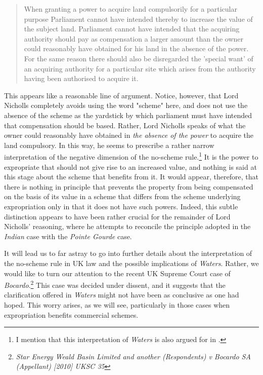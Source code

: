 \begin{quote}
When granting a power to acquire land compulsorily for a particular purpose Parliament cannot have intended thereby to increase the value of the subject land. Parliament cannot have intended that the acquiring authority should pay as compensation a larger amount than the owner could reasonably have obtained for his land in the absence of the power. For the same reason there should also be disregarded the 'special want' of an acquiring authority for a particular site which arises from the authority having been authorised to acquire it.
\end{quote}

This appears like a reasonable line of argument. Notice, however, that Lord Nicholls completely avoids using the word "scheme" here, and does not use the absence of the scheme as the yardstick by which parliament must have intended that compensation should be based. Rather, Lord Nicholls speaks of what the owner could reasonably have obtained in \emph{the absence of the power} to acquire the land compulsory. In this way, he seems to prescribe a rather narrow interpretation of the negative dimension of the no-scheme rule.\footnote{I mention that this interpretation of \emph{Waters} is also argued for in \cite{newuk}.} It is the power to expropriate that should not give rise to an increased value, and nothing is said at this stage about the scheme that benefits from it. It would appear, therefore, that there is nothing in principle that prevents the property from being compensated on the basis of its value in a scheme that differs from the scheme underlying expropriation only in that it does not have such powers. Indeed, this subtle distinction appears to have been rather crucial for the remainder of Lord Nicholls' reasoning, where he attempts to reconcile the principle adopted in the \emph{Indian} case with the \emph{Pointe Gourde} case.

It will lead us to far astray to go into further details about the interpretation of the no-scheme rule in UK law and the possible implications of \emph{Waters}. Rather, we would like to turn our attention to the recent UK Supreme Court case of \emph{Bocardo}.\footnote{\emph{Star Energy Weald Basin Limited and another (Respondents) v Bocardo SA (Appellant) [2010] UKSC 35}} This case was decided under dissent, and it suggests that the clarification offered in \emph{Waters} might not have been as conclusive as one had hoped. This worry arises, as we will see, particularly in those cases when expropriation benefits commercial schemes.

